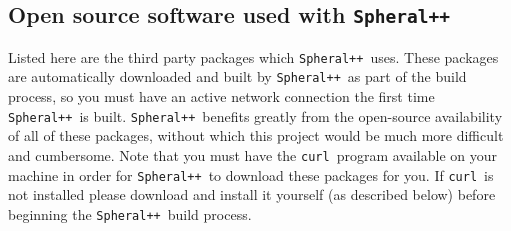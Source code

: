 \documentclass{article}
\newcommand{\Spheral}{{\tt Spheral++}}
\newcommand{\curl}{{\tt curl}}
\begin{document}
\subsection{Open source software used with \Spheral}
\label{free.sec}
Listed here are  the third party packages which  \Spheral\ uses.  These packages
are  automatically  downloaded and  built  by \Spheral\  as  part  of the  build
process,  so  you  must  have  an  active  network  connection  the  first  time
\Spheral\  is  built.  \Spheral\  benefits   greatly  from   the  open-source
availability of all of these packages,  without which this project would be much
more difficult and cumbersome.  Note that you must have the \curl\ program
available on your machine in order for \Spheral\ to download these packages for
you.  If \curl\ is not installed please download and install it yourself (as
described below) before beginning the \Spheral\ build process.
\end{document}
